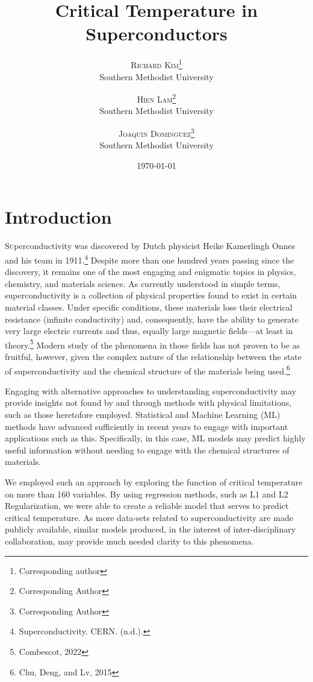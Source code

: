 \documentclass[twoside,twocolumn]{article}
\title{Critical Temperature in Superconductors} %
\author{%
\textsc{Richard Kim}\thanks{Corresponding author} \\[1ex] %
\normalsize Southern Methodist University \\ %
\and %
\textsc{Hien Lam}\thanks{Corresponding Author} \\[1ex] %
\normalsize Southern Methodist University \\ %
\and %
\textsc{Joaquin Dominguez}\thanks{Corresponding Author} \\[1ex] %
\normalsize Southern Methodist University \\ %
}
\date{\today} %
\begin{document}
\maketitle


\section{Introduction}

\lettrine[nindent=0em,lines=3]{S} uperconductivity was discovered by Dutch physicist Heike Kamerlingh Onnes and his team in 1911.\footnote{Superconductivity. CERN. (n.d.).} Despite more than one hundred years passing since the discovery, it remains one of the most engaging and enigmatic topics in physics, chemistry, and materials science. As currently understood in simple terms, superconductivity is a collection of physical properties found to exist in certain material classes. Under specific conditions, these materials lose their electrical resistance (infinite conductivity) and, consequently, have the ability to generate very large electric currents and thus, equally large magnetic fields---at least in theory.\footnote{Combescot, 2022} Modern study of the phenomena in those fields has not proven to be as fruitful, however, given the complex nature of the relationship between the state of superconductivity and the chemical structure of the materials being used.\footnote{Chu, Deng, and Lv, 2015} 

Engaging with alternative approaches to understanding superconductivity may provide insights not found by and through methods with physical limitations, such as those heretofore employed. Statistical and Machine Learning (ML) methods have advanced sufficiently in recent years to engage with important applications such as this. Specifically, in this case, ML models may predict highly useful information without needing to engage with the chemical structures of materials. 

We employed such an approach by exploring the function of critical temperature on more than 160 variables.
By using regression methods, such as L1 and L2 Regularization, we were able to create a reliable model that serves to predict critical temperature. As more data-sets related to superconductivity are made publicly available, similar models  produced, in the interest of inter-disciplinary collaboration, may provide much needed clarity to this phenomena.
\end{document}
